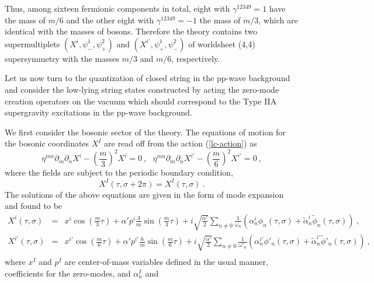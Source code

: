 \documentclass[a4paper,12pt]{article}
\numberwithin{equation}{section}
\begin{document}
Thus, among sixteen fermionic components in total, eight with
$\gamma^{12349}=1$ have the mass of $m/6$ and the other eight with
$\gamma^{12349}=-1$ the mass of $m/3$, which are identical with the
masses of bosons. Therefore the theory contains two supermultiplets
$(X^i, \psi^1_-, \psi^2_+)$ and $(X^{i'}, \psi^1_+, \psi^2_-)$ of
worldsheet (4,4) supersymmetry with the masses $m/3$ and $m/6$,
respectively.

Let us now turn to the quantization of closed string in the pp-wave
background \cite{hyu158} and consider the low-lying string states
constructed by acting the zero-mode creation operators on the vacuum
which should correspond to the Type IIA supergravity excitations in
the pp-wave background.

We first consider the bosonic sector of the theory.  The equations of
motion for the bosonic coordinates $X^I$ are read off from the action
(\ref{lc-action}) as
\begin{equation}
\eta^{mn} \partial_m \partial_n X^i
  - \left( \frac{m}{3} \right)^2 X^i = 0 ~,~~~
\eta^{mn} \partial_m \partial_n X^{i'}
  - \left( \frac{m}{6} \right)^2 X^{i'} = 0~,
\label{beom}
\end{equation}
where the fields are subject to the periodic boundary condition,
\begin{equation}
X^I (\tau, \sigma+2 \pi) = X^I (\tau, \sigma)~.
\end{equation}
The solutions of the above equations are given in the form of mode
expansion and found to be
\begin{eqnarray}
X^i (\tau,\sigma)
  &=& x^i \cos \left( \frac{m}{3} \tau \right)
     + \alpha' p^i \frac{3}{m}
             \sin \left( \frac{m}{3} \tau \right)
   + i \sqrt{ \frac{\alpha'}{2} } \sum_{n \neq 0}
         \frac{1}{\omega_n}
      ( \alpha^i_n \phi_n (\tau, \sigma )
    + \tilde{\alpha}^i_n \tilde{\phi}_n (\tau, \sigma) ) ~,
                                   \nonumber \\
X^{i'} (\tau,\sigma)
  &=& x^{i'} \cos \left( \frac{m}{6} \tau \right)
     + \alpha' p^{i'} \frac{6}{m}
              \sin \left( \frac{m}{6} \tau \right)
   + i \sqrt{ \frac{\alpha'}{2} } \sum_{n \neq 0}
         \frac{1}{\omega'_n}
      ( \alpha^{i'}_n \phi'_n (\tau, \sigma)
     + \tilde{\alpha}^{i'}_n \tilde{\phi}'_n (\tau, \sigma) )~,
                                   \nonumber \\
\label{bmode}
\end{eqnarray}
where $x^I$ and $p^I$ are center-of-mass variables defined in the
usual manner, coefficients for the zero-modes, and $\alpha^I_n$ and
\end{document}
